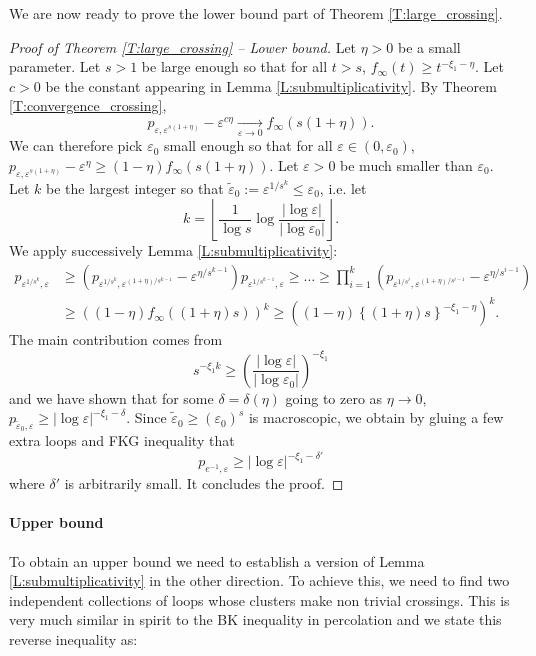 \documentclass[11pt]{article}
\theoremstyle{remark}
\newcommand{\floor}[1]{\left\lfloor #1 \right\rfloor}
\newcommand{\eps}{\varepsilon}
\numberwithin{equation}{section}
\begin{document}
We are now ready to prove the lower bound part of Theorem \ref{T:large_crossing}.


\begin{proof}[Proof of Theorem \ref{T:large_crossing} -- Lower bound]
Let $\eta >0$ be a small parameter.
Let $s>1$ be large enough so that for all $t > s$, $f_\infty(t) \geq t^{-{\xi_1} - \eta}$.
Let $c>0$ be the constant appearing in Lemma \ref{L:submultiplicativity}.
By Theorem \ref{T:convergence_crossing},
\[
p_{\eps,\eps^{s(1+\eta)}} - \eps^{c\eta} \xrightarrow[ \eps \to 0]{} f_\infty(s(1+\eta)).
\]
We can therefore pick $\eps_0$ small enough so that for all $\eps \in (0,\eps_0)$, $p_{\eps, \eps^{s(1+\eta)}} - \eps^\eta \geq (1-\eta) f_\infty(s(1+\eta)) $. Let $\eps>0$ be much smaller than $\eps_0$. Let $k$ be the largest integer so that
$\tilde{\eps}_0 := \eps^{1/s^k} \leq \eps_0$, i.e. let
\[
k = \floor{ \frac{1}{\log s} \log \frac{|\log \eps|}{|\log \eps_0|} }.
\]
We apply successively Lemma \ref{L:submultiplicativity}:
\begin{align*}
p_{\eps^{1/s^k},\eps} & \geq \left( p_{\eps^{1/s^k},\eps^{(1+\eta)/s^{k-1}}} - \eps^{\eta/s^{k-1}} \right) p_{\eps^{1/s^{k-1}},\eps} \geq  \dots \geq \prod_{i=1}^{k} \left( p_{\eps^{1/s^i},\eps^{(1+\eta)/s^{i-1}}} - \eps^{\eta/s^{i-1}} \right) \\
& \geq \left( (1-\eta) f_\infty((1+\eta)s) \right)^k
\geq \left( (1-\eta) \left\{ (1+\eta)s \right\}^{-{\xi_1} - \eta} \right)^k.
\end{align*}
The main contribution comes from
\[
s^{-{\xi_1} k } \geq \left( \frac{|\log \eps|}{|\log \eps_0|} \right)^{-{\xi_1}}
\]
and we have shown that for some $\delta = \delta(\eta)$ going to zero as $\eta \to 0$,
$
p_{\tilde{\eps}_0,\eps} \geq |\log \eps|^{-{\xi_1} - \delta}.
$
Since $\tilde{\eps}_0 \geq (\eps_0)^{s}$ is macroscopic, we obtain by gluing a few extra loops and FKG inequality that
\[
p_{e^{-1},\eps} \geq |\log \eps|^{-{\xi_1} - \delta'}
\]
where $\delta'$ is arbitrarily small. It concludes the proof.
\end{proof}

\paragraph{Upper bound}

To obtain an upper bound we need to establish a version of Lemma \ref{L:submultiplicativity} in the other direction. To achieve this, we need to find two independent collections of loops whose clusters make non trivial crossings. This is very much similar in spirit to the BK inequality in percolation and we state this reverse inequality as:
\end{document}
